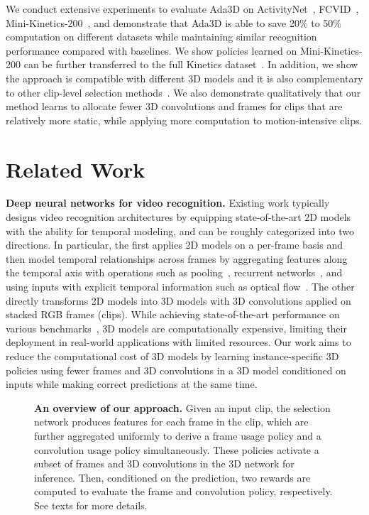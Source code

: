 \documentclass[final]{cvpr}
\newcommand{\system}{{Ada3D}\xspace}
\begin{document}
We conduct extensive experiments to evaluate \system on ActivityNet~\cite{anet}, FCVID~\cite{fcvid}, Mini-Kinetics-200~\cite{s3d,quovadis}, and demonstrate that \system is able to save 20\% to 50\% computation on different datasets while maintaining similar recognition performance compared with baselines. We show policies learned on Mini-Kinetics-200 can be further transferred to the full Kinetics dataset~\cite{quovadis}. In addition, we show the approach is compatible with different 3D models and it is also complementary to other clip-level selection methods~\cite{scsampler,adaframe,marl,listentolook,dsn}. We also demonstrate qualitatively that our method learns to allocate fewer 3D convolutions and frames for clips that are relatively more static, while applying more computation to motion-intensive clips. 


\section{Related Work} \label{sec:relatedwork}

\noindent\textbf{Deep neural networks for video recognition.} Existing work typically designs video recognition architectures by equipping state-of-the-art 2D models with the ability for temporal modeling, and can be roughly categorized into two directions. In particular, the first applies 2D models on a per-frame basis and then model temporal relationships across frames by aggregating features along the temporal axis with operations such as pooling~\cite{tsn,twostream,chris2016}, recurrent networks~\cite{recurrentdonahue,recurrentjoe,videolstm}, and using inputs with explicit temporal information such as optical flow~\cite{twostream,chris2016,tsn}. The other~\cite{quovadis,c3d,p3d,r21d,slowfast,x3d} directly transforms 2D models into 3D models with 3D convolutions applied on stacked RGB frames (clips). While achieving state-of-the-art performance on various benchmarks~\cite{quovadis,anet,sthsth}, 3D models are computationally expensive, limiting their deployment in real-world applications with limited resources. Our work aims to reduce the computational cost of 3D models by learning instance-specific 3D policies using fewer frames and 3D convolutions in a 3D model conditioned on inputs while making correct predictions at the same time.


\begin{figure*}[!t] \centering
    \vspace{-0.15in}
    \caption{\textbf{An overview of our approach.} Given an input clip, the selection network produces features for each frame in the clip, which are further aggregated uniformly to derive a frame usage policy and a convolution usage policy simultaneously. These policies activate a subset of frames and 3D convolutions in the 3D network for inference. Then, conditioned on the prediction, two rewards are computed to evaluate the frame and convolution policy, respectively. See texts for more details.}
   \label{fig:approach}
   \end{figure*}
\end{document}
